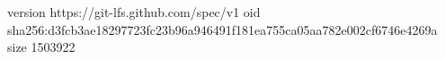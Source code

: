 version https://git-lfs.github.com/spec/v1
oid sha256:d3fcb3ae18297723fc23b96a946491f181ea755ca05aa782e002cf6746e4269a
size 1503922
